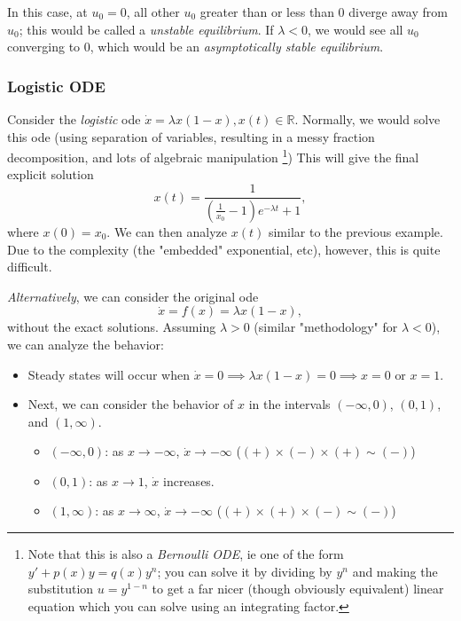 \documentclass[12pt]{article}
\begin{document}
In this case, at $u_0 = 0$, all other $u_0$ greater than or less than $0$ diverge away from $u_0$; this would be called a \textit{unstable equilibrium}. If $\lambda < 0$, we would see all $u_0$ converging to $0$, which would be an \textit{asymptotically stable equilibrium}.

\subsubsection{Logistic ODE}

Consider the \textit{logistic} ode $\dot{x} = \lambda x (1-x), x(t) \in \mathbb{R}$. Normally, we would solve this ode (using separation of variables, resulting in a messy fraction decomposition, and lots of algebraic manipulation \footnote{Note that this is also a \emph{Bernoulli ODE}, ie one of the form $y' +p(x)y = q(x)y^n$; you can solve it by dividing by $y^n$ and making the substitution $u = y^{1-n}$ to get a far nicer (though obviously equivalent) linear equation which you can solve using an integrating factor.}) This will give the final explicit solution \[x(t) = \frac{1}{(\frac{1}{x_0}-1)e^{-\lambda t} + 1},\] where $x(0) = x_0$. We can then analyze $x(t)$ similar to the previous example. Due to the complexity (the "embedded" exponential, etc), however, this is quite difficult.

\textit{Alternatively}, we can consider the original ode \[\dot{x} = f(x) = \lambda x (1-x),\] without the exact solutions. Assuming $\lambda > 0$ (similar "methodology" for $\lambda < 0$), we can analyze the behavior:

\begin{itemize}
  \item Steady states will occur when $\dot{x} = 0 \implies  \lambda x (1-x) = 0  \implies x = 0 \text{ or } x = 1$.
  \item Next, we can consider the behavior of $x$ in the intervals $(-\infty, 0)$, $(0, 1)$, and $(1, \infty)$.
  \begin{itemize}
    \item $(-\infty, 0)$: as $x \to - \infty$, $\dot{x} \to -\infty$ ($(+) \times (-) \times (+) \sim (-) $)
    \item $(0, 1)$: as $x \to 1$, $\dot{x}$ increases.
    \item $(1, \infty)$: as $x \to \infty$, $\dot{x} \to -\infty$ ($(+) \times (+) \times (-) \sim (-) $)
  \end{itemize}
\end{itemize}
\end{document}
